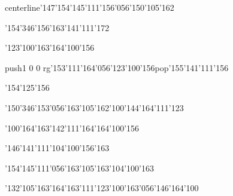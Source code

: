 centerline{\enskip\enskip\enskip\enskip\enskip\enskip\enskip\char'147\char'154\char'145\char'111\char'156\char'056\char'150\char'105\char'162}\medskip\centerline{\enskip\char'154\char'346\char'156\enskip\enskip\enskip\enskip\char'163\char'141\char'111\char'172}\medskip\centerline{\enskip\char'123\char'100\char'163\enskip\enskip\enskip\enskip\char'164\char'100\char'156}\medskip\centerline{\enskip\enskip\enskip\enskip\enskip\enskip\pdfcolorstack\match push{1 0 0 rg}\char'153\char'111\char'164\char'056\char'123\char'100\char'156\pdfcolorstack\match pop{}\enskip\char'155\char'141\char'111\char'156\enskip\enskip\enskip\enskip}\medskip\centerline{\enskip\char'154\char'125\char'156\enskip\enskip\enskip\enskip\enskip\enskip\enskip\enskip\enskip\enskip\enskip\enskip\enskip}\medskip\centerline{\enskip\char'150\char'346\char'153\char'056\char'163\char'105\char'162\enskip\char'100\char'144\enskip\enskip\enskip\char'164\char'111\char'123}\medskip\centerline{\enskip\char'100\char'164\char'163\enskip\enskip\enskip\char'142\char'111\char'164\enskip\char'164\char'100\char'156}\medskip\centerline{\enskip\char'146\char'141\char'111\enskip\char'104\char'100\char'156\char'163\enskip\enskip\enskip\enskip\enskip\enskip\enskip}\medskip\centerline{\enskip\enskip\enskip\enskip\char'154\char'145\char'111\char'056\char'163\char'105\char'163\enskip\char'104\char'100\char'163}\medskip\centerline{\enskip\enskip\enskip\enskip\enskip\char'132\char'105\char'163\char'164\char'163\enskip\char'111\char'123\enskip\char'100\char'163\char'056\char'146\char'164\char'100}\medskip\vfill\footline{\hfil\tt\folio\hfil}\eject

